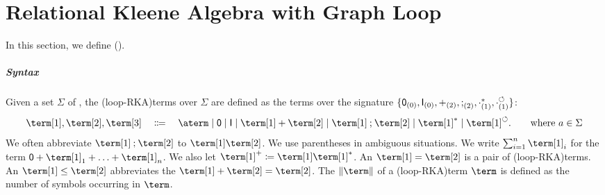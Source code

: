 \documentclass[10pt,a4paper]{article}
\theoremstyle{definition}
\theoremstyle{remark}
\DeclarePairedDelimiter\set{\{}{\}}
\newcommand{\const}[1]{\mathsf{#1}}
\newcommand{\bl}{\cdot}
\newcommand{\defeq}{\coloneq}
\newcommand{\union}{\mathbin{+}}
\newcommand{\id}{\const{I}}
\newcommand{\emp}{\const{0}}
\newcommand{\compo}{\mathbin{;}}
\newcommand{\lop}{\circlearrowleft}
\newcommand{\vsig}{\Sigma}
\begin{document}
%
%
%
%
%
%
%
%
%
%
%
%
%
%
%
%
%
%

%
%
%
%
%
%
%
%

%
%
%
%
%
%
%
%
%
%
%
%
%
%
%
%
%
%
%
%
%
%
%
%
%
%
%
%
%
%
%
%
%
%
%
%
%
%
%
%
%
%
%
%
%
%
%
%
%
%
%
%
%

%
%
%
%
%
%
%
%
%
%
%
%
%
%
%
%
%
%
%
%
%
%
%
%
%
%
%
%
%
%
%
%
%
%
%
%
%
%
%
%
%
%
%
%
%
%
%
%
%
%
%
%
%
%
%
%
%
%
%

%
%
%
%
%
%
%

\section{Relational Kleene Algebra with Graph Loop}\label{section: RKA with graph loop}
\AP
In this section,
we define \intro*{} (\reintro*{}).

\subparagraph*{Syntax}
\AP
Given a set $\vsig$ of \intro*{},
the \intro*\kl(loop-RKA){terms} over $\vsig$ 
are defined as the terms over the signature $\set{\emp_{(0)}, \id_{(0)}, \union_{(2)}, \compo_{(2)}, \bl^{*}_{(1)}, \bl^{\lop}_{(1)}}$: 
\begin{align*}
    \term[1], \term[2], \term[3] \quad\Coloneqq\quad \aterm \mid \emp \mid \id \mid \term[1] \union \term[2] \mid \term[1] \compo \term[2] \mid \term[1]^* \mid \term[1]^{\lop}. \tag*{where $a \in \vsig$}
\end{align*}
We often abbreviate $\term[1] \compo \term[2]$ to $\term[1] \term[2]$.
We use parentheses in ambiguous situations.
We write $\sum_{i = 1}^{n} \term[1]_i$ for the term $\emp \union \term[1]_1 \union \dots \union \term[1]_n$.
We also let $\term[1]^{+} \defeq \term[1] \term[1]^*$.
\AP
An \intro*{} $\term[1] = \term[2]$ is a pair of \kl(loop-RKA){terms}.
An \intro*{} $\term[1] \le \term[2]$ abbreviates the  $\term[1] \union \term[2] = \term[2]$.
The \intro*{} $\|\term\|$ of a \kl(loop-RKA){term} $\term$ is defined as the number of symbols occurring in $\term$.

%
%
%
%
%
%
%
%
%
%
%
\end{document}
